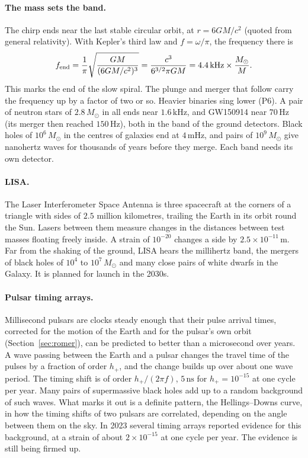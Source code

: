 \paragraph{The mass sets the band.} The chirp ends near the last stable circular orbit, at $r=6GM/c^2$ (quoted from general relativity). With Kepler's third law and $f=\omega/\pi$, the frequency there is
\begin{equation}
	f_{\rm end}=\frac{1}{\pi}\sqrt{\frac{GM}{(6GM/c^2)^3}}=\frac{c^3}{6^{3/2}\pi GM}=4.4\,\mathrm{kHz}\times\frac{M_\odot}{M}.
	\label{cs:eq:f_end}
\end{equation}
This marks the end of the slow spiral. The plunge and merger that follow carry the frequency up by a factor of two or so.
Heavier binaries sing lower (P6). A pair of neutron stars of $2.8\,M_\odot$ in all ends near $1.6\,\mathrm{kHz}$, and GW150914 near $70\,\mathrm{Hz}$ (its merger then reached $150\,\mathrm{Hz}$), both in the band of the ground detectors. Black holes of $10^6\,M_\odot$ in the centres of galaxies end at $4\,\mathrm{mHz}$, and pairs of $10^9\,M_\odot$ give nanohertz waves for thousands of years before they merge. Each band needs its own detector.

\paragraph{LISA.} The Laser Interferometer Space Antenna is three spacecraft at the corners of a triangle with sides of $2.5$ million kilometres, trailing the Earth in its orbit round the Sun. Lasers between them measure changes in the distances between test masses floating freely inside. A strain of $10^{-20}$ changes a side by $2.5\times10^{-11}\,\mathrm m$. Far from the shaking of the ground, LISA hears the millihertz band, the mergers of black holes of $10^4$ to $10^7\,M_\odot$ and many close pairs of white dwarfs in the Galaxy. It is planned for launch in the 2030s.

\paragraph{Pulsar timing arrays.} Millisecond pulsars are clocks steady enough that their pulse arrival times, corrected for the motion of the Earth and for the pulsar's own orbit (Section~\ref{sec:romer}), can be predicted to better than a microsecond over years. A wave passing between the Earth and a pulsar changes the travel time of the pulses by a fraction of order $h_+$, and the change builds up over about one wave period. The timing shift is of order $h_+/(2\pi f)$, $5\,\mathrm{ns}$ for $h_+=10^{-15}$ at one cycle per year. Many pairs of supermassive black holes add up to a random background of such waves. What marks it out is a definite pattern, the Hellings–Downs curve, in how the timing shifts of two pulsars are correlated, depending on the angle between them on the sky. In 2023 several timing arrays reported evidence for this background, at a strain of about $2\times10^{-15}$ at one cycle per year. The evidence is still being firmed up.

